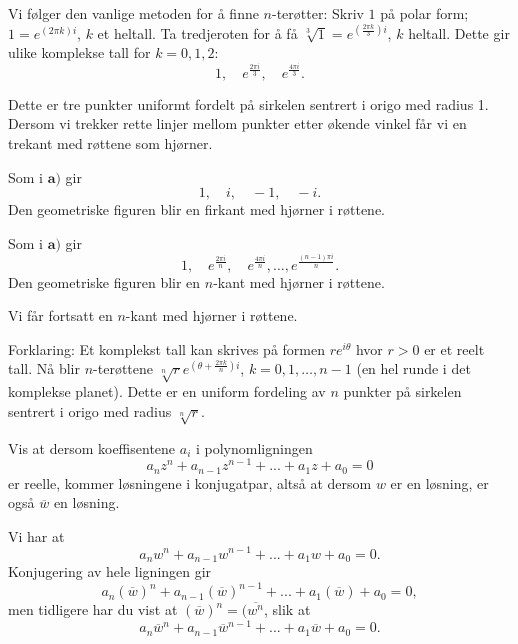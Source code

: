 \begin{losning}

\begin{punkt}
Vi følger den vanlige metoden for å finne $n$-terøtter: Skriv $1$ på polar form; $1=e^{(2\pi k )i}$, $k$ et heltall. Ta tredjeroten for å få $\sqrt[3]{1}=e^{(\frac{2\pi k}{3} )i}$, $k$ heltall. Dette gir ulike komplekse tall for $k=0,1,2$: 
$$1,\quad e^{\frac{2\pi i}{3}}, \quad e^{\frac{4\pi i}{3}}.$$ 

\noindent
Dette er tre punkter uniformt fordelt på sirkelen sentrert i origo med radius 1. Dersom vi trekker rette linjer mellom punkter etter økende vinkel får vi en trekant med røttene som hjørner.
\end{punkt}

\begin{punkt}
Som i $\textbf{a)}$ gir $$1,\quad i,\quad -1, \quad -i. $$ Den geometriske figuren blir en firkant med hjørner i røttene.
\end{punkt}

\begin{punkt}
Som i $\textbf{a)}$ gir $$1,\quad e^{\frac{2\pi i}{n}},\quad e^{\frac{4\pi i}{n}},\dots,e^{\frac{(n-1)\pi i}{n}}.$$ Den geometriske figuren blir en $n$-kant med hjørner i røttene.
\end{punkt}

\begin{punkt}
Vi får fortsatt en $n$-kant med hjørner i røttene.

\noindent
Forklaring: Et komplekst tall kan skrives på formen $re^{i\theta}$ hvor $r>0$ er et reelt tall. Nå blir $n$-terøttene $\sqrt[n]{r}e^{(\theta+\frac{2\pi k}{n})i}$, $k=0,1,\dots, n-1$ (en hel runde i det komplekse planet). Dette er en uniform fordeling av $n$ punkter på sirkelen sentrert i origo med radius $\sqrt[n]{r}$.
\end{punkt}

\end{losning}


\begin{oppgave}
Vis at dersom koeffisentene $a_i$ i polynomligningen
\[
a_nz^n+a_{n-1}z^{n-1}+...+a_1z+a_0=0
\]
er reelle, kommer løsningene i konjugatpar, altså at dersom $w$ er en løsning, er også $\overline w$ en løsning.
\end{oppgave}

\begin{losning}
Vi har at
\[
a_nw^n+a_{n-1}w^{n-1}+...+a_1w+a_0=0.
\]
Konjugering av hele ligningen gir 
\[
a_n(\overline w)^n+a_{n-1}(\overline w)^{n-1}+...+a_1(\overline w)+a_0=0,
\]
men tidligere har du vist at $(\overline w)^n=(\overline {w^n}$, slik at 
\[
a_n\overline w^n+a_{n-1}\overline w^{n-1}+...+a_1\overline w+a_0=0.
\]



\end{losning}



